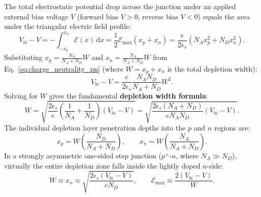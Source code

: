 \documentclass[11pt,a4paper]{article}
\newcommand{\dd}{\mathrm{d}}
\begin{document}
The total electrostatic potential drop across the junction under an applied external bias voltage $V$ (forward bias $V > 0$, reverse bias $V < 0$) equals the area under the triangular electric field profile:
\begin{equation}
    V_{bi} - V = -\int_{-x_p}^{x_n} \mathcal{E}(x)\,\dd x = \frac{1}{2}\mathcal{E}_{\max} (x_p + x_n) = \frac{e}{2\epsilon_s}\left(N_A x_p^2 + N_D x_n^2\right).
\end{equation}
Substituting $x_p = \frac{N_D}{N_A + N_D}W$ and $x_n = \frac{N_A}{N_A + N_D}W$ from Eq.~\eqref{eq:charge_neutrality_pn} (where $W = x_p + x_n$ is the total depletion width):
\begin{equation}
    V_{bi} - V = \frac{e}{2\epsilon_s} \frac{N_A N_D}{N_A + N_D} W^2.
\end{equation}
Solving for $W$ gives the fundamental \textbf{depletion width formula}:
\begin{equation}
    \boxed{W = \sqrt{\frac{2\epsilon_s}{e}\left(\frac{1}{N_A} + \frac{1}{N_D}\right)(V_{bi} - V)} = \sqrt{\frac{2\epsilon_s(N_A + N_D)}{e N_A N_D}(V_{bi} - V)}.}
    \label{eq:depletion_width_master}
\end{equation}
The individual depletion layer penetration depths into the $p$ and $n$ regions are:
\begin{equation}
    \boxed{x_p = W\left(\frac{N_D}{N_A + N_D}\right), \qquad x_n = W\left(\frac{N_A}{N_A + N_D}\right).}
\end{equation}
In a strongly asymmetric one-sided step junction ($p^+$-$n$, where $N_A \gg N_D$), virtually the entire depletion zone falls inside the lightly doped $n$-side:
\begin{equation}
    W \approx x_n \approx \sqrt{\frac{2\epsilon_s (V_{bi} - V)}{e N_D}}, \qquad \mathcal{E}_{\max} \approx \frac{2(V_{bi} - V)}{W}.
\end{equation}
\end{document}
